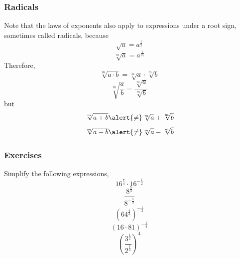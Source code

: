 \documentclass[xcolor=dvipsnames]{beamer}
\begin{document}
\begin{frame}
  \frametitle{Radicals}
  Note that the laws of exponents also apply to expressions under a
  root sign, sometimes called \alert{radicals}, because
  \begin{equation}
    \label{eq:shoaphoo}
    \sqrt{a}=a^{\frac{1}{2}}
  \end{equation}
  \begin{equation}
    \label{eq:thishoof}
    \sqrt[m]{a}=a^{\frac{1}{m}}
  \end{equation}
  Therefore,
  \begin{equation}
    \label{eq:oisheidu}
    \sqrt[m]{a\cdot{}b}=\sqrt[m]{a}\cdot\sqrt[m]{b}
  \end{equation}
  \begin{equation}
    \label{eq:xahpiesh}
    \sqrt[m]{\frac{a}{b}}=\frac{\sqrt[m]{a}}{\sqrt[m]{b}}
  \end{equation}
  but
  \begin{equation}
    \label{eq:ucaithoh}
    \sqrt[m]{a+b}\alert{\neq}\sqrt[m]{a}+\sqrt[m]{b}
  \end{equation}
  \begin{equation}
    \label{eq:quohseiy}
    \sqrt[m]{a-b}\alert{\neq}\sqrt[m]{a}-\sqrt[m]{b}
  \end{equation}
\end{frame}

\begin{frame}
  \frametitle{Exercises}
Simplify the following expressions,
\begin{equation}
  \label{eq:ohahgaoy}
  16^{\frac{7}{4}}\cdot{}16^{-\frac{1}{2}}
\end{equation}
\begin{equation}
  \label{eq:ungeipau}
  \frac{8^{\frac{5}{3}}}{8^{-\frac{1}{3}}}
\end{equation}
\begin{equation}
  \label{eq:zaiquahu}
  \left(64^{\frac{4}{3}}\right)^{-\frac{1}{2}}
\end{equation}
\begin{equation}
  \label{eq:uobeigha}
  (16\cdot{}81)^{-\frac{1}{4}}
\end{equation}
\begin{equation}
  \label{eq:neeshaej}
  \left(\frac{3^{\frac{1}{2}}}{2^{\frac{1}{3}}}\right)^{4}
\end{equation}
\end{frame}
\end{document}
